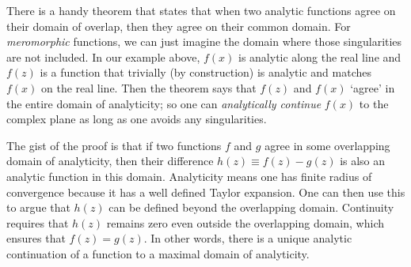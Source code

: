 \documentclass[
  11pt,
	colorful,
	raggedright,
]{tufte-style-thesis-flip}
\begin{document}
There is a handy theorem that states that when two analytic functions agree on their domain of overlap, then they agree on their common domain. For \emph{meromorphic} functions, we can just imagine the domain where those singularities are not included. In our example above, $f(x)$ is analytic along the real line and $f(z)$ is a function that trivially (by construction) is analytic and matches $f(x)$ on the real line. Then the theorem says that $f(z)$ and $f(x)$ `agree' in the entire domain of analyticity; so one can \emph{analytically continue} $f(x)$ to the complex plane as long as one avoids any singularities.

The gist of the proof is that if two functions $f$ and  $g$ agree in some overlapping domain of analyticity, then their difference $h(z)\equiv f(z)-g(z)$ is also an analytic function in this domain. Analyticity means one has finite radius of convergence because it has a well defined Taylor expansion. One can then use this to argue that $h(z)$ can be defined beyond the overlapping domain. Continuity requires that $h(z)$ remains zero even outside the overlapping domain, which ensures that $f(z)=g(z)$. In other words, there is a unique analytic continuation of a function to a maximal domain of analyticity.
\end{document}
